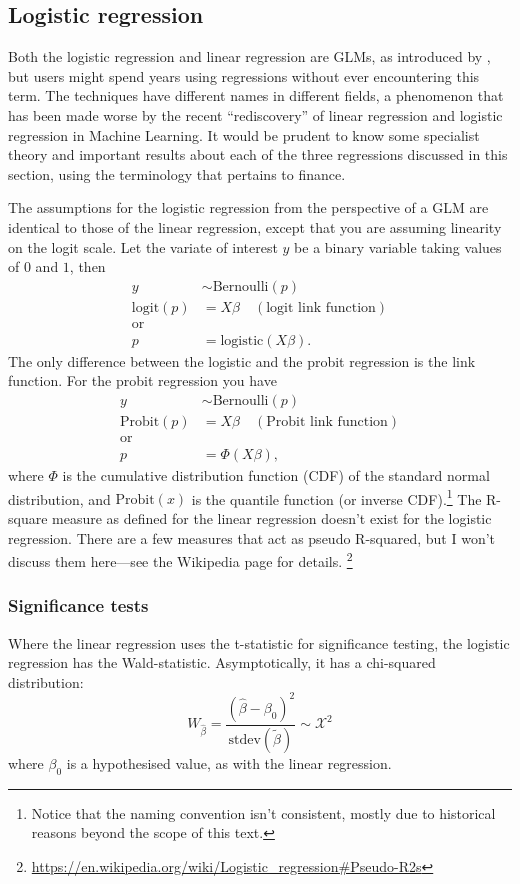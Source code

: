 \documentclass[a4paper]{article}
\begin{document}
\subsection{Logistic regression}
Both the logistic regression and linear regression are GLMs, as introduced by \citet{GLM}, but users might spend years using regressions without ever encountering this term.
The techniques have different names in different fields, a phenomenon that has been made worse by the recent ``rediscovery'' of linear regression and logistic regression in Machine Learning.
It would be prudent to know some specialist theory and important results  about each of the three regressions discussed in this section, using the terminology that pertains to finance.

The assumptions for the logistic regression from the perspective of a GLM are identical to those of the linear regression, except that you are assuming linearity on the logit scale.
Let the variate of interest $y$ be a binary variable taking values of $0$ and $1$, then
\begin{align*}
y &\sim \text{Bernoulli}(p) \\
\text{logit}(p) &= X\beta  \quad (\text{logit link function})\\
\text{or}& \\
p &= \text{logistic}(X\beta)
\text{.}
\end{align*}
The only difference between the logistic and the probit regression is the link function.
For the probit regression you have
\begin{align*}
y &\sim \text{Bernoulli}(p) \\
\text{Probit}(p) &= X\beta  \quad (\text{Probit link function})\\
\text{or}& \\
p &= \Phi(X\beta)
\text{,}
\end{align*}
where $\Phi$ is the cumulative distribution function (CDF) of the standard normal distribution, and   $\text{Probit}(x)$ is the quantile function (or inverse CDF).\footnote{Notice that the naming convention isn't consistent, mostly due to historical reasons beyond the scope of this text.}
The R-square measure as defined for the linear regression doesn't exist for the logistic regression.
There are a few measures that act as pseudo R-squared, but I won't discuss them here---see the Wikipedia page for details.%
\footnote{\url{https://en.wikipedia.org/wiki/Logistic_regression\#Pseudo-R2s}}

\subsubsection{Significance tests}
Where the linear regression uses the t-statistic for significance testing, the logistic regression has the Wald-statistic. Asymptotically, it has a chi-squared distribution:
\[
W_{\hat\beta} =
\frac{(\hat\beta - \beta_0)^2}{ \text{stdev}( \tilde\beta) }
\sim \mathcal{X}^2
\]
where $\beta_0$ is a hypothesised value, as with the linear regression.
\end{document}
